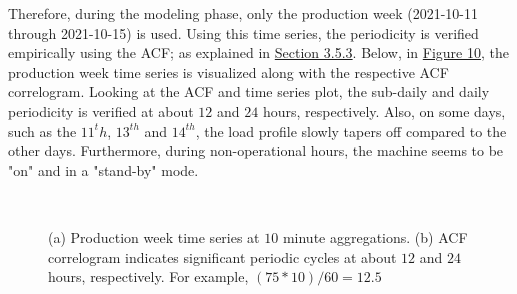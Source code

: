 Therefore, during the modeling phase, only the production week (2021-10-11 through 2021-10-15) is used. Using this time series, the periodicity is verified empirically using the ACF; as explained in \hyperlink{subsubsection.3.5.3}{Section 3.5.3}. Below, in \hyperlink{figure.10}{Figure 10}, the production week time series is visualized along with the respective ACF correlogram. Looking at the ACF and time series plot, the sub-daily and daily periodicity is verified at about $12$ and $24$ hours, respectively. Also, on some days, such as the $11^th$, $13^{th}$ and $14^{th}$, the load profile slowly tapers off compared to the other days. Furthermore, during non-operational hours, the machine seems to be "on" and in a "stand-by" mode.  

\begin{figure}[H]
    \centering
    \graphicspath{ {./images/} }
     \\
    \caption{(a) Production week time series at $10$ minute aggregations. (b) ACF correlogram indicates significant periodic cycles at about $12$ and $24$ hours, respectively. For example, $(75*10) / 60 = 12.5$} \label{fig:AB}
    \label{fig:my_label}
\end{figure}

